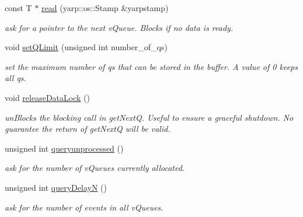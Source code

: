 \begin{DoxyCompactItemize}
const T $\ast$ \hyperlink{classev_1_1vReadPort_a8f35f4c4fecc0d416e69fc9ef43140c2}{read} (yarp\+::os\+::\+Stamp \&yarpstamp)
\begin{DoxyCompactList}\small\item\em ask for a pointer to the next v\+Queue. Blocks if no data is ready. \end{DoxyCompactList}\item 
\mbox{\label{classev_1_1vReadPort_a1f8d56c7a4ec77f622c448c46c65afd8}} 
void \hyperlink{classev_1_1vReadPort_a1f8d56c7a4ec77f622c448c46c65afd8}{set\+Q\+Limit} (unsigned int number\+\_\+of\+\_\+qs)
\begin{DoxyCompactList}\small\item\em set the maximum number of qs that can be stored in the buffer. A value of 0 keeps all qs. \end{DoxyCompactList}\item 
\mbox{\label{classev_1_1vReadPort_ab451342e9bc479c3db4a937ce41f7795}} 
void \hyperlink{classev_1_1vReadPort_ab451342e9bc479c3db4a937ce41f7795}{release\+Data\+Lock} ()
\begin{DoxyCompactList}\small\item\em un\+Blocks the blocking call in get\+NextQ. Useful to ensure a graceful shutdown. No guarantee the return of get\+NextQ will be valid. \end{DoxyCompactList}\item 
\mbox{\label{classev_1_1vReadPort_a43a2b8ca3db8938e8200072de2957ef8}} 
unsigned int \hyperlink{classev_1_1vReadPort_a43a2b8ca3db8938e8200072de2957ef8}{queryunprocessed} ()
\begin{DoxyCompactList}\small\item\em ask for the number of v\+Queues currently allocated. \end{DoxyCompactList}\item 
\mbox{\label{classev_1_1vReadPort_a61466cf1cfcd794c5735c8bcc43dd8b5}} 
unsigned int \hyperlink{classev_1_1vReadPort_a61466cf1cfcd794c5735c8bcc43dd8b5}{query\+DelayN} ()
\begin{DoxyCompactList}\small\item\em ask for the number of events in all v\+Queues. \end{DoxyCompactList}\item 

\end{DoxyCompactItemize}
